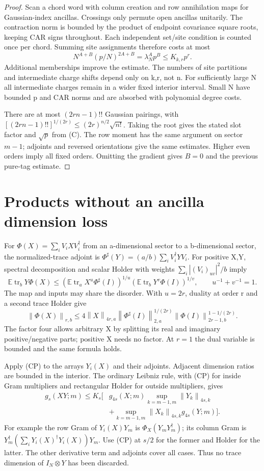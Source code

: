 \documentclass[11pt]{article}
\newcommand{\E}{\mathbb E}
\newcommand{\tr}{\operatorname{tr}}
\newcommand{\norm}[1]{\left\lVert#1\right\rVert}
\begin{document}
\begin{proof}
Scan a chord word with column creation and row annihilation maps
for Gaussian-index ancillas. Crossings only permute open ancillas
unitarily. The contraction norm is bounded by the product of
endpoint covariance square roots, keeping CAR signs throughout.
Each independent set/site condition is counted once per chord.
Summing site assignments therefore costs at most
\[
 N^{A+B}(p/N)^{2A+B}=\lambda_N^A p^B\le K_{k,r}p^r. \tag{C}
\]
Additional memberships improve the estimate. The numbers of site
partitions and intermediate charge shifts depend only on k,r,
not n. For sufficiently large N all intermediate charges remain
in a wider fixed interior interval. Small N have bounded p and
CAR norms and are absorbed with polynomial degree costs.

There are at most $(2rn-1)!!$ Gaussian pairings, with
$[(2rn-1)!!]^{1/(2r)}\le(2r)^{n/2}\sqrt{n!}$.
Taking the root gives the stated slot factor and $\sqrt p$ from
(C). The row moment has the same argument on sector $m-1$;
adjoints and reversed orientations give the same estimates.
Higher even orders imply all fixed orders. Omitting the gradient
gives $B=0$ and the previous pure-tag estimate.
\end{proof}

\section{Products without an ancilla dimension loss}
For $\Phi(X)=\sum_iV_iXV_i^\dagger$ from an a-dimensional sector
to a b-dimensional sector, the normalized-trace adjoint is
$\Phi^\sharp(Y)=(a/b)\sum_iV_i^\dagger YV_i$.
For positive X,Y, spectral decomposition and scalar Holder with
weights $\sum_i|(V_i)_{uv}|^2/b$ imply
\[
 \E\tr_bY\Phi(X)\le
 (\E\tr_aX^u\Phi^\sharp(I))^{1/u}
 (\E\tr_bY^v\Phi(I))^{1/v},\qquad u^{-1}+v^{-1}=1.
\]
The map and inputs may share the disorder. With $u=2r$, duality
at order r and a second trace Holder give
\[
 \norm{\Phi(X)}_{r,b}\le
 4\norm X_{4r,a}\norm{\Phi^\sharp(I)}_{2,a}^{1/(2r)}
                   \norm{\Phi(I)}_{2r-1,b}^{1-1/(2r)}. \tag{CP}
\]
The factor four allows arbitrary X by splitting its real and
imaginary positive/negative parts; positive X needs no factor.
At $r=1$ the dual variable is bounded and the same formula holds.

Apply (CP) to the arrays $Y_i(X)$ and their adjoints. Adjacent
dimension ratios are bounded in the interior. The ordinary
Leibniz rule, with (CP) for inside Gram multipliers and rectangular
Holder for outside multipliers, gives
\begin{align*}
 g_s(XY;m)\le K_s\bigl[
 &g_{4s}(X;m)\sup_{k=m-1,m}\norm{Y_k}_{4s,k}\\
 &+\sup_{k=m-1,m}\norm{X_k}_{4s,k}g_{4s}(Y;m)\bigr]. \tag{B}
\end{align*}
For example the row Gram of $Y_i(X)Y_m$ is
$\Phi_X(Y_mY_m^\dagger)$; its column Gram is
$Y_m^\dagger(\sum_iY_i(X)^\dagger Y_i(X))Y_m$.
Use (CP) at $s/2$ for the former and Holder for the latter.
The other derivative term and adjoints cover all cases. Thus
no trace dimension of $I_N\otimes Y$ has been discarded.
\end{document}
